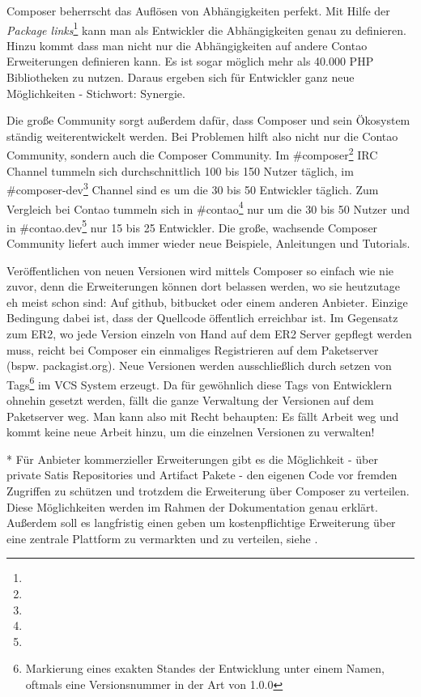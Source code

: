\documentclass[
paper=a4,
draft=false,%
fontsize=10pt%
]{scrartcl}
\begin{document}
Composer beherrscht das Auflösen von Abhängigkeiten perfekt. Mit Hilfe der \textit{Package links}\footnote{} kann man als Entwickler die Abhängigkeiten genau zu definieren. Hinzu kommt dass man nicht nur die Abhängigkeiten auf andere Contao Erweiterungen definieren kann. Es ist sogar möglich mehr als 40.000 PHP Bibliotheken zu nutzen. Daraus ergeben sich für Entwickler ganz neue Möglichkeiten - Stichwort: Synergie.

Die große Community sorgt außerdem dafür, dass Composer und sein Ökosystem ständig weiterentwickelt werden. Bei Problemen hilft also nicht nur die Contao Community, sondern auch die Composer Community. Im \#composer\footnote{} IRC Channel tummeln sich durchschnittlich 100 bis 150 Nutzer täglich, im \#composer-dev\footnote{} Channel sind es um die 30 bis 50 Entwickler täglich. Zum Vergleich bei Contao tummeln sich in \#contao\footnote{} nur um die 30 bis 50 Nutzer und in \#contao.dev\footnote{} nur 15 bis 25 Entwickler. Die große, wachsende Composer Community liefert auch immer wieder neue  Beispiele, Anleitungen und Tutorials.

Veröffentlichen von neuen Versionen wird mittels Composer so einfach wie nie zuvor, denn die Erweiterungen können dort belassen werden, wo sie heutzutage eh meist schon sind: Auf github, bitbucket oder einem anderen Anbieter. Einzige Bedingung dabei ist, dass der Quellcode öffentlich erreichbar ist. Im Gegensatz zum ER2, wo jede Version einzeln von Hand auf dem ER2 Server gepflegt werden muss, reicht bei Composer ein einmaliges Registrieren auf dem Paketserver (bspw. packagist.org). Neue Versionen werden ausschließlich durch setzen von Tags\footnote{Markierung eines exakten Standes der Entwicklung unter einem Namen, oftmals eine Versionsnummer in der Art von 1.0.0} im VCS System erzeugt. Da für gewöhnlich diese Tags von Entwicklern ohnehin gesetzt werden, fällt die ganze Verwaltung der Versionen auf dem Paketserver weg. Man kann also mit Recht behaupten: Es fällt Arbeit weg und kommt keine neue Arbeit hinzu, um die einzelnen Versionen zu verwalten!

\begin{info}
* Für Anbieter kommerzieller Erweiterungen gibt es die Möglichkeit - über private Satis Repositories und Artifact Pakete - den eigenen Code vor fremden Zugriffen zu schützen und trotzdem die Erweiterung über Composer zu verteilen. Diese Möglichkeiten werden im Rahmen der Dokumentation genau erklärt. Außerdem soll es langfristig einen  geben um kostenpflichtige Erweiterung über eine zentrale Plattform zu vermarkten und zu verteilen, siehe .
\end{info}
\end{document}

